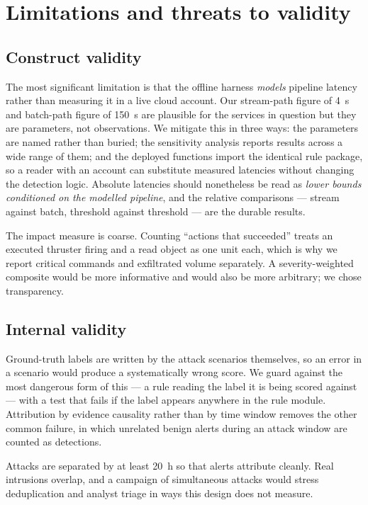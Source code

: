 \section{Limitations and threats to validity}
\label{sec:limitations}

\subsection{Construct validity}

The most significant limitation is that the offline harness \emph{models}
pipeline latency rather than measuring it in a live cloud account. Our
stream-path figure of \SI{4}{\second} and batch-path figure of \SI{150}{\second}
are plausible for the services in question but they are parameters, not
observations. We mitigate this in three ways: the parameters are named rather
than buried; the sensitivity analysis reports results across a wide range of
them; and the deployed functions import the identical rule package, so a reader
with an account can substitute measured latencies without changing the detection
logic. Absolute latencies should nonetheless be read as \emph{lower bounds
conditioned on the modelled pipeline}, and the relative comparisons --- stream
against batch, threshold against threshold --- are the durable results.

The impact measure is coarse. Counting ``actions that succeeded'' treats an
executed thruster firing and a read object as one unit each, which is why we
report critical commands and exfiltrated volume separately. A severity-weighted
composite would be more informative and would also be more arbitrary; we chose
transparency.

\subsection{Internal validity}

Ground-truth labels are written by the attack scenarios themselves, so an error
in a scenario would produce a systematically wrong score. We guard against the
most dangerous form of this --- a rule reading the label it is being scored
against --- with a test that fails if the label appears anywhere in the rule
module. Attribution by evidence causality rather than by time window removes the
other common failure, in which unrelated benign alerts during an attack window
are counted as detections.

Attacks are separated by at least \SI{20}{\hour} so that alerts attribute
cleanly. Real intrusions overlap, and a campaign of simultaneous attacks would
stress deduplication and analyst triage in ways this design does not measure.

